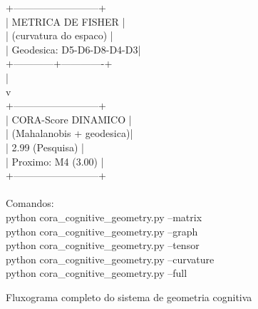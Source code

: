 \begin{figure}[H]
{\begin{minipage}{0.85\textwidth}
                    +--------------------------+\\
                    | METRICA DE FISHER        |\\
                    | (curvatura do espaco)    |\\
                    | Geodesica: D5-D6-D8-D4-D3|\\
                    +------------+-------------+\\
                                 |\\
                                 v\\
                    +--------------------------+\\
                    | CORA-Score DINAMICO      |\\
                    | (Mahalanobis + geodesica)|\\
                    | 2.99 (Pesquisa)          |\\
                    | Proximo: M4 (3.00)       |\\
                    +--------------------------+\\
\\
Comandos:\\
  python cora\_cognitive\_geometry.py --matrix\\
  python cora\_cognitive\_geometry.py --graph\\
  python cora\_cognitive\_geometry.py --tensor\\
  python cora\_cognitive\_geometry.py --curvature\\
  python cora\_cognitive\_geometry.py --full\\
\end{minipage}}
\caption{Fluxograma completo do sistema de geometria cognitiva}
\end{figure}
